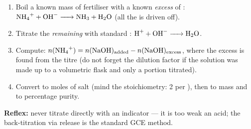 \documentclass[11pt]{article}
\begin{document}
\begin{methode}
\begin{enumerate}
\item Boil a known mass of fertiliser with a known \emph{excess} of : $\ce{NH4+ + OH- -> NH3 + H2O}$ (all the  is driven off).
\item Titrate the \emph{remaining}  with standard : $\ce{H+ + OH- -> H2O}$.
\item Compute: $n(\ce{NH4+}) = n(\ce{NaOH})_{\text{added}} - n(\ce{NaOH})_{\text{excess}}$, where the excess is found from the titre (do not forget the dilution factor if the solution was made up to a volumetric flask and only a portion titrated).
\item Convert to moles of salt (mind the stoichiometry: 2  per ), then to mass and to percentage purity.
\end{enumerate}
\textbf{Reflex:} never titrate  directly with an indicator — it is too weak an acid; the back-titration via  release is the standard GCE method.
\end{methode}
\end{document}
